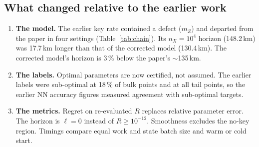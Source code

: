 \documentclass[11pt,a4paper]{article}
\begin{document}
\subsection{What changed relative to the earlier work}
\begin{enumerate}
\item \textbf{The model.} The earlier key rate contained a defect ($m_Z$) and departed from the paper in four
  settings (Table~\ref{tab:chain}). Its $n_X=10^4$ horizon (148.2\,km) was 17.7\,km longer than that of the
  corrected model (130.4\,km). The corrected model's horizon is 3\,\% below the paper's $\sim$135\,km.
\item \textbf{The labels.} Optimal parameters are now certified, not assumed. The earlier labels were
  sub-optimal at 18\,\% of bulk points and at all tail points, so the earlier NN accuracy figures measured
  agreement with sub-optimal targets.
\item \textbf{The metrics.} Regret on re-evaluated $R$ replaces relative parameter error. The horizon is
  $\ell=0$ instead of $R\ge10^{-12}$. Smoothness excludes the no-key region. Timings compare equal work and state
  batch size and warm or cold start.
\end{enumerate}
\end{document}
